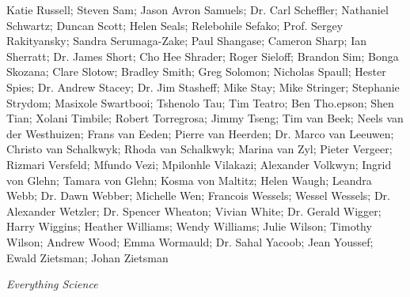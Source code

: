     Katie Russell;
    Steven Sam;
    Jason Avron Samuels;
Dr. Carl Scheffler;
    Nathaniel Schwartz;
    Duncan Scott;
    Helen Seals;
    Relebohile Sefako;
    Prof. Sergey Rakityansky;
    Sandra Serumaga-Zake;
    Paul Shangase;
    Cameron Sharp;
    Ian Sherratt;
Dr. James Short;
    Cho Hee Shrader;
    Roger Sieloff;
    Brandon Sim;
    Bonga Skozana;
    Clare Slotow;
    Bradley Smith;
    Greg Solomon;
    Nicholas Spaull;
    Hester Spies;
Dr. Andrew Stacey;
Dr. Jim Stasheff;
    Mike Stay;
    Mike Stringer;
    Stephanie Strydom;
    Masixole Swartbooi;
    Tshenolo Tau;
    Tim Teatro;
    Ben Tho.epson;
    Shen Tian;
    Xolani Timbile;
    Robert Torregrosa;
    Jimmy Tseng;
    Tim van Beek;
    Neels van der Westhuizen;
    Frans van Eeden;
    Pierre van Heerden;
Dr. Marco van Leeuwen;
    Christo van Schalkwyk;
    Rhoda van Schalkwyk;
    Marina van Zyl;
    Pieter Vergeer;
    Rizmari Versfeld;
    Mfundo Vezi;
    Mpilonhle Vilakazi;
    Alexander Volkwyn;
    Ingrid von Glehn;
    Tamara von Glehn;
    Kosma von Maltitz;
    Helen Waugh;
    Leandra Webb;
Dr. Dawn Webber;
    Michelle Wen;
    Francois Wessels;
    Wessel Wessels;
Dr. Alexander Wetzler;
Dr. Spencer Wheaton;
    Vivian White;
Dr. Gerald Wigger;
    Harry Wiggins;
    Heather Williams;
    Wendy Williams;
    Julie Wilson;
    Timothy Wilson;
    Andrew Wood;
    Emma Wormauld;
Dr. Sahal Yacoob;
    Jean Youssef;
    Ewald Zietsman;
    Johan Zietsman



\newpage
\thispagestyle{empty}

{\normalfont\sffamily\fontsize{22}\normalfont\itshape Everything Science} \par

